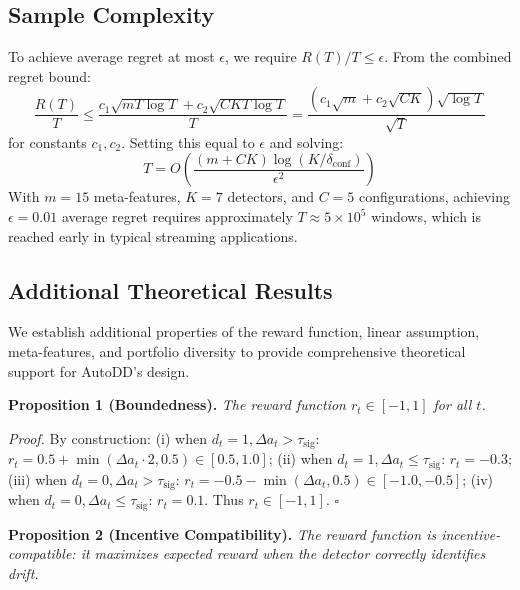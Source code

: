 \documentclass[11pt]{article}
\begin{document}
\subsection{Sample Complexity}

To achieve average regret at most $\epsilon$, we require $R(T)/T \leq \epsilon$. From the combined regret bound:
\begin{equation}
\frac{R(T)}{T} \leq \frac{c_1\sqrt{mT\log T} + c_2\sqrt{CKT\log T}}{T} = \frac{(c_1\sqrt{m} + c_2\sqrt{CK})\sqrt{\log T}}{\sqrt{T}}
\end{equation}
for constants $c_1, c_2$. Setting this equal to $\epsilon$ and solving:
\begin{equation}
T = O\left(\frac{(m + CK)\log(K/\delta_{\text{conf}})}{\epsilon^2}\right)
\end{equation}
With $m = 15$ meta-features, $K = 7$ detectors, and $C = 5$ configurations, achieving $\epsilon = 0.01$ average regret requires approximately $T \approx 5 \times 10^5$ windows, which is reached early in typical streaming applications.


\subsection{Additional Theoretical Results}

We establish additional properties of the reward function, linear assumption, meta-features, and portfolio diversity to provide comprehensive theoretical support for AutoDD's design.

\textbf{Proposition 1 (Boundedness).} \textit{The reward function $r_t \in [-1, 1]$ for all $t$.}

\textit{Proof.} By construction: (i) when $d_t=1, \Delta a_t > \tau_{\text{sig}}$: $r_t = 0.5 + \min(\Delta a_t \cdot 2, 0.5) \in [0.5, 1.0]$; (ii) when $d_t=1, \Delta a_t \leq \tau_{\text{sig}}$: $r_t = -0.3$; (iii) when $d_t=0, \Delta a_t > \tau_{\text{sig}}$: $r_t = -0.5 - \min(\Delta a_t, 0.5) \in [-1.0, -0.5]$; (iv) when $d_t=0, \Delta a_t \leq \tau_{\text{sig}}$: $r_t = 0.1$. Thus $r_t \in [-1, 1]$. \hfill $\square$

\textbf{Proposition 2 (Incentive Compatibility).} \textit{The reward function is incentive-compatible: it maximizes expected reward when the detector correctly identifies drift.}
\end{document}
